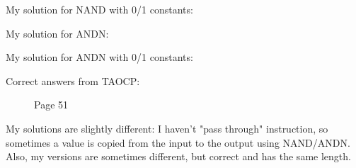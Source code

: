 

My solution for NAND with 0/1 constants:



My solution for ANDN:



My solution for ANDN with 0/1 constants:



Correct answers from \ac{TAOCP}:

\begin{figure}[H]
\centering
{}
\caption{Page 51}
\end{figure}

My solutions are slightly different: I haven't "pass through" instruction, so sometimes a value is copied from the input to the output using NAND/ANDN.
Also, my versions are sometimes different, but correct and has the same length.

